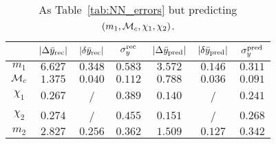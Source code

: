 \begin{table}
  \caption{\label{tab:NN_errors_temp} As Table~\ref{tab:NN_errors} but predicting $(m_1, {\cal{M}}_c, \chi_1, \chi_2)$. }
  \begin{center}
  \begin{tabular}{c|ccc|ccc}
  \hline\hline
  & $|\Delta \bar{y}_{\rm rec}|$  & $|\delta \bar{y}_{\rm rec}|$  & $\sigma_y^{\rm rec}$ & 
     $|\Delta \bar{y}_{\rm pred}|$ & $|\delta \bar{y}_{\rm pred}|$ & $\sigma_y^{\rm pred}$ \\
  \hline\hline
$m_1$          & $6.627$ & $0.348$ & $0.583$ & $3.572$ & $0.146$ & $0.311$ \\
${\cal{M}}_c$  & $1.375$ & $0.040$ & $0.112$ & $0.788$ & $0.036$ & $0.091$ \\
$\chi_1$       & $0.267$ &  /  & $0.389$ & $0.140$ &  /  & $0.241$ \\
$\chi_2$       & $0.274$ &  /  & $0.455$ & $0.151$ &  /  & $0.268$ \\
\hline
$m_2$          & $2.827$ & $0.256$ & $0.362$ & $1.509$ & $0.127$ & $0.342$ \\
  \hline\hline
\end{tabular}
\end{center}
\end{table}